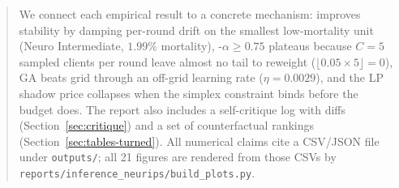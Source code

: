 \begin{abstract}
We connect each empirical result to a concrete mechanism: \fedprox{} improves
stability by damping per-round drift on the smallest low-mortality unit
(Neuro Intermediate, $1.99\%$ mortality), \cvar{}-$\alpha\!\geq\!0.75$
plateaus because $C\!=\!5$ sampled clients per round leave almost no tail to
reweight ($\lfloor 0.05\!\times\!5 \rfloor = 0$), GA beats grid through an off-grid
learning rate ($\eta \!=\! 0.0029$), and the LP shadow price collapses when the
simplex constraint binds before the budget does. The report also includes a
self-critique log with diffs (Section~\ref{sec:critique}) and a set of
counterfactual rankings (Section~\ref{sec:tables-turned}). All numerical claims
cite a CSV/JSON file under \texttt{outputs/}; all 21 figures are rendered from those CSVs by
\texttt{reports/inference\_neurips/build\_plots.py}.
\end{abstract}
